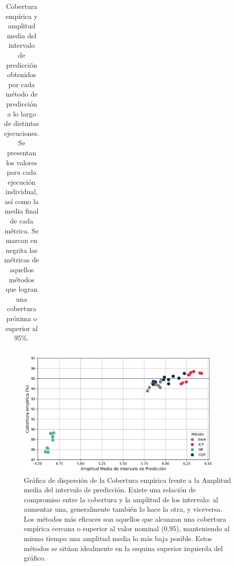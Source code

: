 \begin{table}[h]
\begin{tabular}{cccccccccccl}
    \bottomrule
    \end{tabular}
    \caption[
        Problema de estimación de edad: 
        Cobertura empírica y amplitud media del intervalo de predicción obtenidos por cada método de predicción a lo largo de distintas ejecuciones.
    ]{   
        Cobertura empírica y amplitud media del intervalo de predicción obtenidos por cada método de predicción a lo largo de distintas ejecuciones. 
        Se presentan los valores para cada ejecución individual, así como la media final de cada métrica. 
        Se marcan en negrita las métricas de aquellos métodos que logran una cobertura próxima o superior al 95\%.
    }
    \label{tab:AE_EC_MPIW_comparative}
\end{table}

\begin{figure}[h]
    \centering
    \includegraphics[width=0.9\textwidth]{capitulos/cap_05/imagenes/AE_scatterplot_EC-MPIW.png}
    \caption[
        Problema de estimación de edad:
        Gráfica de dispersión de la cobertura empírica frente a la amplitud media del intervalo de predicción.
    ]{
        Gráfica de dispersión de la Cobertura empírica frente a la Amplitud media del intervalo de predicción.
        Existe una relación de compromiso entre la cobertura y la amplitud de los intervalo: al aumentar una, generalmente también lo hace la otra, y viceversa. Los métodos más eficaces son aquellos que alcanzan una cobertura empírica cercana o superior al valor nominal (0.95), manteniendo al mismo tiempo una amplitud media lo más baja posible. Estos métodos se sitúan idealmente en la esquina superior izquierda del gráfico.
    }
    \label{fig:AE_scatterplot_EC-MPIW}
\end{figure}


